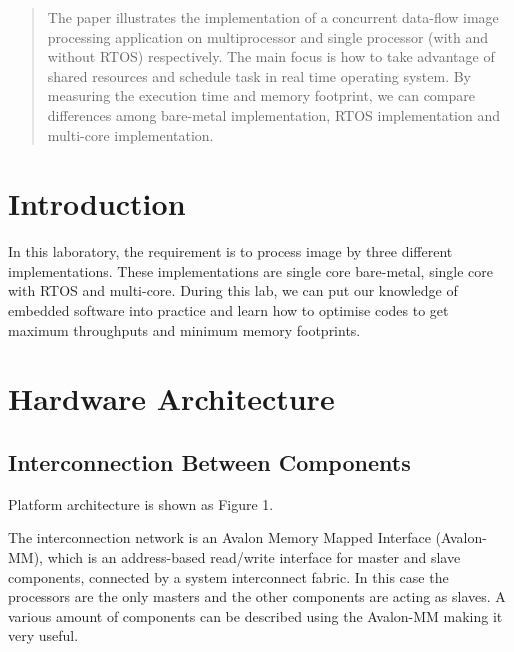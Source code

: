\documentclass[conference,compsoc]{IEEEtran}
\begin{document}
    
    
    
    
    
    
    
    \maketitle
    
    \begin{abstract}
      The paper illustrates the implementation of a concurrent data-flow image processing application on multiprocessor and single processor (with and without RTOS) respectively. The main focus is how to take advantage of shared resources and schedule task in real time operating system. By measuring the execution time and memory footprint, we can compare differences among bare-metal implementation, RTOS implementation and multi-core implementation.
    \end{abstract}
    
    
    
    
    
    \IEEEpeerreviewmaketitle
    \section{Introduction}
    In this laboratory, the requirement is to process image
    by three different implementations. These implementations are single core 
   bare-metal, single core with RTOS and multi-core. 
  During this lab, we can put our knowledge of embedded software into practice
and learn how to optimise codes to get maximum throughputs and minimum memory footprints.
    \section{Hardware Architecture}
    \subsection{Interconnection Between Components}
  Platform architecture is shown as Figure 1.
\par The interconnection network is an Avalon Memory Mapped
Interface (Avalon-MM), which is an address-based read/write
interface for master and slave components, connected by a
system interconnect fabric. In this case the processors are the
only masters and the other components are acting as slaves.
A various amount of components can be described using the
Avalon-MM making it very useful.
\cite{IEEEhowto:kopka}
  
\end{document}
